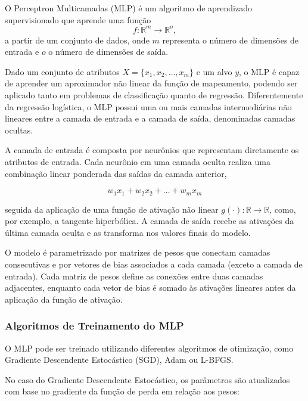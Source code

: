 O Perceptron Multicamadas (MLP) é um algoritmo de aprendizado supervisionado que aprende uma função 
\begin{equation}
f: \mathbb{R}^{m} \rightarrow \mathbb{R}^{o},
\label{eq:mlp_mapeamento}
\end{equation}
a partir de um conjunto de dados, onde \( m \) representa o número de dimensões de entrada e \( o \) o número de dimensões de saída. 

Dado um conjunto de atributos \( X = \{x_1, x_2, \dots, x_m\} \) e um alvo \( y \), o MLP é capaz de aprender um aproximador não linear da função de mapeamento, podendo ser aplicado tanto em problemas de classificação quanto de regressão. Diferentemente da regressão logística, o MLP possui uma ou mais camadas intermediárias não lineares entre a camada de entrada e a camada de saída, denominadas camadas ocultas.

A camada de entrada é composta por neurônios que representam diretamente os atributos de entrada. Cada neurônio em uma camada oculta realiza uma combinação linear ponderada das saídas da camada anterior,

\begin{equation}
w_1 x_1 + w_2 x_2 + \dots + w_m x_m
\end{equation}


seguida da aplicação de uma função de ativação não linear \( g(\cdot) : \mathbb{R} \rightarrow \mathbb{R} \), como, por exemplo, a tangente hiperbólica. A camada de saída recebe as ativações da última camada oculta e as transforma nos valores finais do modelo.

O modelo é parametrizado por matrizes de pesos que conectam camadas consecutivas e por vetores de bias associados a cada camada (exceto a camada de entrada). Cada matriz de pesos define as conexões entre duas camadas adjacentes, enquanto cada vetor de bias é somado às ativações lineares antes da aplicação da função de ativação.

\subsubsection{Algoritmos de Treinamento do MLP}

O MLP pode ser treinado utilizando diferentes algoritmos de otimização, como Gradiente Descendente Estocástico (SGD), Adam ou L-BFGS.

No caso do Gradiente Descendente Estocástico, os parâmetros são atualizados com base no gradiente da função de perda em relação aos pesos:

